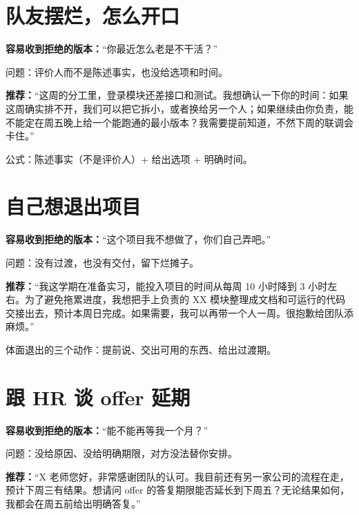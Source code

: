 \documentclass[UTF8,zihao=5,openany]{ctexbook}
\begin{document}
\section{队友摆烂，怎么开口}
\begin{casebox}
\textbf{容易收到拒绝的版本：}“你最近怎么老是不干活？”
\end{casebox}

问题：评价人而不是陈述事实，也没给选项和时间。

\begin{casebox}
\textbf{推荐：}“这周的分工里，登录模块还差接口和测试。我想确认一下你的时间：如果这周确实排不开，我们可以把它拆小，或者换给另一个人；如果继续由你负责，能不能定在周五晚上给一个能跑通的最小版本？我需要提前知道，不然下周的联调会卡住。”
\end{casebox}

公式：陈述事实（不是评价人）+ 给出选项 + 明确时间。

\section{自己想退出项目}
\begin{casebox}
\textbf{容易收到拒绝的版本：}“这个项目我不想做了，你们自己弄吧。”
\end{casebox}

问题：没有过渡，也没有交付，留下烂摊子。

\begin{casebox}
\textbf{推荐：}“我这学期在准备实习，能投入项目的时间从每周 10 小时降到 3 小时左右。为了避免拖累进度，我想把手上负责的 XX 模块整理成文档和可运行的代码交接出去，预计本周日完成。如果需要，我可以再带一个人一周。很抱歉给团队添麻烦。”
\end{casebox}

体面退出的三个动作：提前说、交出可用的东西、给出过渡期。

\section{跟 HR 谈 offer 延期}
\begin{casebox}
\textbf{容易收到拒绝的版本：}“能不能再等我一个月？”
\end{casebox}

问题：没给原因、没给明确期限，对方没法替你安排。

\begin{casebox}
\textbf{推荐：}“X 老师您好，非常感谢团队的认可。我目前还有另一家公司的流程在走，预计下周三有结果。想请问 offer 的答复期限能否延长到下周五？无论结果如何，我都会在周五前给出明确答复。”
\end{casebox}
\end{document}
